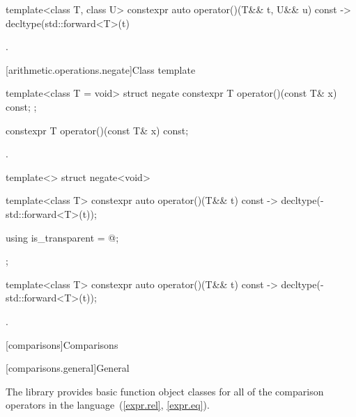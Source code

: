 %
\begin{itemdecl}
template<class T, class U> constexpr auto operator()(T&& t, U&& u) const
    -> decltype(std::forward<T>(t) %
\end{itemdecl}

\begin{itemdescr}
\pnum
\returns
{}.
\end{itemdescr}

[arithmetic.operations.negate]{Class template }

%
\begin{itemdecl}
template<class T = void> struct negate {
  constexpr T operator()(const T& x) const;
};
\end{itemdecl}

%
\begin{itemdecl}
constexpr T operator()(const T& x) const;
\end{itemdecl}

\begin{itemdescr}
\pnum
\returns
{}.
\end{itemdescr}

%
\begin{itemdecl}
template<> struct negate<void> {
  template<class T> constexpr auto operator()(T&& t) const
    -> decltype(-std::forward<T>(t));

  using is_transparent = @\unspec@;
};
\end{itemdecl}

%
\begin{itemdecl}
template<class T> constexpr auto operator()(T&& t) const
    -> decltype(-std::forward<T>(t));
\end{itemdecl}

\begin{itemdescr}
\pnum
\returns
{}.
\end{itemdescr}


[comparisons]{Comparisons}

[comparisons.general]{General}

\pnum
The library provides basic function object classes for all of the comparison
operators in the language~(\ref{expr.rel}, \ref{expr.eq}).

